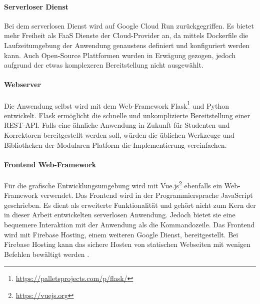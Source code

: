 \paragraph{Serverloser Dienst} Bei dem serverlosen Dienst wird auf Google Cloud Run zurückgegriffen.
Es bietet mehr Freiheit als FaaS Dienste der Cloud-Provider an, da mittels Dockerfile die Laufzeitumgebung
der Anwendung genaustens definiert und konfiguriert werden kann. Auch Open-Source
Plattformen wurden in Erwägung gezogen, jedoch aufgrund der etwas komplexeren Bereitstellung nicht ausgewählt.

\paragraph{Webserver} Die Anwendung selbst wird mit dem Web-Framework
Flask\footnote{\url{https://palletsprojects.com/p/flask/}}
und Python entwickelt. Flask ermöglicht die schnelle und
unkomplizierte Bereitstellung einer REST-API. Falls eine ähnliche Anwendung in Zukunft
für Studenten und Korrektoren bereitgestellt werden soll, würden die üblichen Werkzeuge und
Bibliotheken der Modularen Platform die Implementierung vereinfachen.

\paragraph{Frontend Web-Framework} Für die grafische Entwicklungsumgebung
wird mit Vue.js\footnote{\url{https://vuejs.org}} ebenfalls ein Web-Framework verwendet.
Das Frontend wird in der Programmiersprache JavaScript geschrieben. Es dient als
erweiterte Funktionalität und gehört nicht zum Kern der in dieser Arbeit entwickelten
serverlosen Anwendung. Jedoch bietet sie eine bequemere Interaktion mit der Anwendung als
die Kommandozeile. Das Frontend wird mit
Firebase Hosting, einem weiteren Google Dienst,
bereitgestellt. Bei Firebase Hosting kann das sichere Hosten von statischen Webseiten
mit wenigen Befehlen bewältigt werden \cite{FirebaseHosting}.

